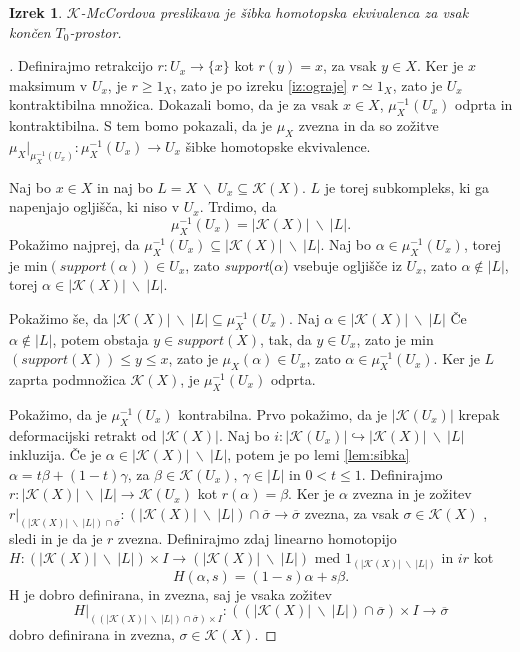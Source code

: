 \documentclass[a4paper,12pt]{article}
\DeclareRobustCommand{\k}{
    \mathcal{K}
}
\theoremstyle{definition}
\theoremstyle{plain}
\newtheorem{izrek}{Izrek}
\theoremstyle{plain}
\theoremstyle{plain}
\theoremstyle{plain}
\theoremstyle{plain}
\newenvironment{dokaz}{\begin{proof}[\bfseries\upshape\proofname]}{\end{proof}}
\begin{document}
\begin{izrek}
    $\mathcal{K}$-\textit{McCordova} preslikava je šibka homotopska 
    ekvivalenca za vsak končen $T_0$-prostor.
\end{izrek}

\begin{dokaz}
    Definirajmo retrakcijo $r:U_x\rightarrow \{x\}$ kot 
    $r(y)=x$, za vsak $y\in X$. Ker je $x$ maksimum v 
    $U_x$, je $r\geq 1_X$, zato je po izreku 
    \ref{iz:ograje} $r\simeq 1_X$, zato je $U_x$ 
    kontraktibilna množica. Dokazali bomo, da je za vsak 
    $x\in X$, $\mu_X^{-1}(U_x)$ odprta in kontraktibilna. S 
    tem bomo pokazali, da je $\mu_X$ zvezna in da so 
    zožitve $\mu_X|_{\mu_X^{-1}(U_x)}:\mu_X^{-1}(U_x)\rightarrow 
    U_x$ šibke homotopske ekvivalence.

    Naj bo $x\in X$ in naj bo $L=X\ \backslash \
    U_x\subseteq \mathcal{K}(X)$. $L$ je torej 
    subkompleks, ki ga napenjajo ogljišča, ki niso v $U_x$. 
    Trdimo, da 
    $$
    \mu_X^{-1}(U_x)=|\mathcal{K}(X)|\ \backslash \ |L|.
    $$
    Pokažimo najprej, da $\mu_X^{-1}(U_x)\subseteq 
    |\mathcal{K}(X)|\ \backslash \ |L|$. Naj bo $\alpha \in 
    \mu_X^{-1}(U_x)$, torej je min$(\textit{support}
    (\alpha))\in U_x$, zato \textit{support}($\alpha$) vsebuje 
    ogljišče iz $U_x$, zato $\alpha \notin |L|$, torej $\alpha 
    \in |\mathcal{K}(X)|\ \backslash \ |L|$.

    Pokažimo še, da $|\mathcal{K}(X)|\ \backslash \
    |L|\subseteq \mu_X^{-1}(U_x)$. Naj $\alpha \in |\mathcal{K}(X)|\ \backslash \ |L|$
    Če  $\alpha \notin |L|$, potem obstaja $y\in 
    \textit{support}(X)$, tak, da $y \in U_x$, zato je 
    min$(\textit{support}(X))\leq y \leq x$, zato je 
    $\mu_X(\alpha) \in U_x$, zato $\alpha \in \mu_X^{-1}
    (U_x)$.
    Ker je $L$ zaprta podmnožica $\mathcal{K}(X)$, je 
    $\mu_X^{-1}(U_x)$ odprta.

    Pokažimo, da je $\mu_X^{-1}(U_x)$ kontrabilna. Prvo pokažimo, da je 
    $|\mathcal{K}(U_x)|$ krepak deformacijski retrakt 
    od $|\mathcal{K}(X)|$. Naj bo $i:|\k(U_x)|\hookrightarrow |\mathcal{K}
    (X)|\ \backslash \ |L|$ inkluzija. Če je $\alpha \in |\mathcal{K}(X)|\ 
    \backslash \ |L|$, potem je po lemi \ref{lem:sibka}  $\alpha = t\beta + 
    (1-t)\gamma$, za $\beta \in \k(U_x), \ \gamma \in |L|$ in $0<t\leq 1$. 
    Definirajmo $r:|\mathcal{K}(X)|\ \backslash \ |L|\rightarrow \k(U_x)$ 
    kot $r(\alpha)=\beta$. Ker je $\alpha$ zvezna in je zožitev $r|_{(|\mathcal{K}(X)|\ \backslash \ |L|)\cap 
    \overline{\sigma}}:(|\mathcal{K}(X)|\ \backslash \ |L|)\cap 
    \overline{\sigma} \rightarrow \overline{\sigma}$ zvezna, za vsak 
    $\sigma \in \k(X)$ , sledi in je da je $r$ zvezna. Definirajmo zdaj linearno homotopijo $H:(|\mathcal{K}(X)|\ \backslash \ |L|) \times I \rightarrow (|\mathcal{K}(X)|\ \backslash \ |L|)$ med $1_{(|\mathcal{K}(X)|\ \backslash \ |L|)}$ in $ir$ kot 
    $$
    H(\alpha,s)=(1-s)\alpha + s\beta.
    $$
    H je dobro definirana, in zvezna, saj je vsaka zožitev 
    $$
    H|_{((|\mathcal{K}(X)|\ \backslash \ |L|)\cap 
    \overline{\sigma})\times I}:((|\mathcal{K}(X)|\ \backslash \ |L|)\cap 
    \overline{\sigma})\times I \rightarrow \overline{\sigma}
    $$
    dobro definirana in zvezna, $\sigma \in \k(X)$.


\end{dokaz}
\end{document}
